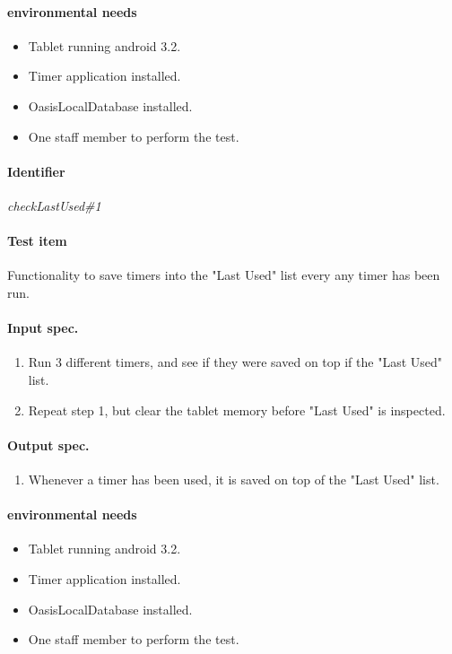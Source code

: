 \paragraph{environmental needs}
	\begin{itemize}
		\item Tablet running android 3.2.
		\item Timer application installed.
		\item OasisLocalDatabase installed.
		\item One staff member to perform the test.
	\end{itemize}

\clearpage
\paragraph{Identifier}
	\textit{checkLastUsed\#1}
\paragraph{Test item}
	Functionality to save timers into the "Last Used" list every any timer has been run.
\paragraph{Input spec.}
	\begin{enumerate}
		\item Run 3 different timers, and see if they were saved on top if the "Last Used" list.
		\item Repeat step 1, but clear the tablet memory before "Last Used" is inspected.
	\end{enumerate}
\paragraph{Output spec.}
	\begin{enumerate}
		\item Whenever a timer has been used, it is saved on top of the "Last Used" list.
	\end{enumerate}
\paragraph{environmental needs}
	\begin{itemize}
		\item Tablet running android 3.2.
		\item Timer application installed.
		\item OasisLocalDatabase installed.
		\item One staff member to perform the test.
	\end{itemize}

